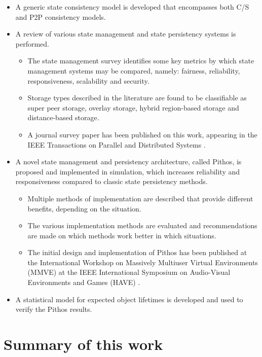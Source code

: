 \begin{itemize}
\item A generic state consistency model is developed that encompasses both C/S and P2P consistency models.

\item A review of various state management and state persistency systems is performed.
    \begin{itemize}
    \item The state management survey identifies some key metrics by which state management systems may be compared, namely: fairness, reliability, responsiveness, scalability and security.
    \item Storage types described in the literature are found to be classifiable as super peer storage, overlay storage, hybrid region-based storage and distance-based storage.
    \item A journal survey paper has been published on this work, appearing in the IEEE Transactions on Parallel and Distributed Systems \cite{gilmore_p2p_mmog_state_persistency}.
    \end{itemize}

\item A novel state management and persistency architecture, called Pithos, is proposed and implemented in simulation, which increases reliability and responsiveness compared to classic state persistency methods.
    \begin{itemize}
    \item Multiple methods of implementation are described that provide different benefits, depending on the situation.
    \item The various implementation methods are evaluated and recommendations are made on which methods work better in which situations.
    \item The initial design and implementation of Pithos has been published at the International Workshop on Massively Multiuser Virtual Environments (MMVE) at the IEEE International Symposium on Audio-Visual Environments and Games (HAVE) \cite{Pithos_mmve_2011}.
    \end{itemize}

\item A statistical model for expected object lifetimes is developed and used to verify the Pithos results.
\end{itemize}

\section{Summary of this work}

